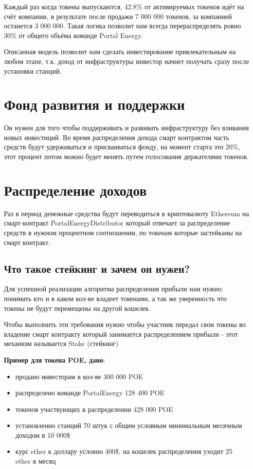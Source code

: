 \documentclass[a4paper,12pt]{report}
\begin{document}
Каждый раз когда токены выпускаются, 42.8\% от активируемых токенов идёт на счёт компании, в результате после продажи 7 000 000 токенов, за компанией останется 3 000 000. Такая логика позволит нам всегда перераспределять ровно 30\% от общего объёма команде Portal Energy.

Описанная модель позволит нам сделать инвестирование привлекательным на любом этапе, т.к. доход от инфраструктуры инвестор начнет получать сразу после установки станций. 

\section{Фонд развития и поддержки}
\label{storage}
Он нужен для того чтобы поддерживать и развивать инфраструктуру без вливания новых инвестиций.
Во время распределения дохода смарт контрактом часть средств будут удерживаться и присваиваться фонду, на момент старта это 20\%, этот процент потом можно будет менять путем голосования держателями токенов. 

\section{Распределение доходов}
\label{capital}
Раз в период денежные средства будут переводиться в криптовалюту Ethereum на смарт-контракт PortalEnergyDistributor который отвечает за распределение средств в нужном процентном соотношении, по токенам которые застейканы на смарт контракт.

\subsection{Что такое стейкинг и зачем он нужен?}

Для успешной реализации алгоритма распределения прибыли нам нужно: понимать кто и в каком кол-ве владеет токенами, а так же уверенность что токены не будут перемещены на другой кошелек. 

Чтобы выполнить эти требования нужно чтобы участник передал свои токены во владение смарт контракту который занимается распределением прибыли - этот механизм называется Stake (стейкинг)

\textbf{Пример для токена POE, дано}:

\begin{itemize}
	\item продано инвесторам в кол-ве 300 000 POE
	\item распределено команде PortalEnergy 128 400 POE
	\item токенов участвующих в распределении 428 000 POE
	\item установленно станций 70 штук с общим условным минимальным месячным доходом в 10 000\$
	\item курс ether к доллару условно 400\$,  на кошелек распределения уходит 25 ether в месяц
\end{itemize}
\end{document}
